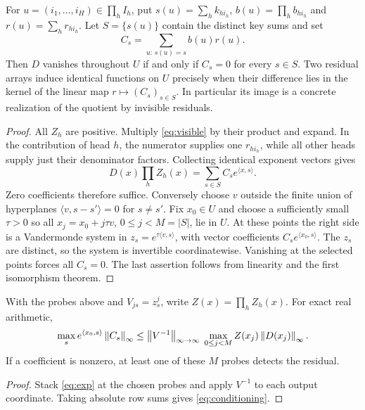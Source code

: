 \begin{theorem}\label{thm:quotient}
For $u=(i_1,\ldots,i_H)\in\prod_h I_h$, put $s(u)=\sum_h k_{h i_h}$, $b(u)=\prod_h b_{h i_h}$ and $r(u)=\sum_h r_{h i_h}$. Let $S=\{s(u)\}$ contain the distinct key sums and set
\begin{equation}
 C_s=\sum_{u:\,s(u)=s} b(u)r(u).
 \label{eq:classes}
\end{equation}
Then $D$ vanishes throughout $U$ if and only if $C_s=0$ for every $s\in S$. Two residual arrays induce identical functions on $U$ precisely when their difference lies in the kernel of the linear map $r\mapsto(C_s)_{s\in S}$. In particular its image is a concrete realization of the quotient by invisible residuals.
\end{theorem}
\begin{proof}
All $Z_h$ are positive. Multiply \eqref{eq:visible} by their product and expand. In the contribution of head $h$, the numerator supplies one $r_{h i_h}$, while all other heads supply just their denominator factors. Collecting identical exponent vectors gives
\begin{equation}
 D(x)\prod_h Z_h(x)=\sum_{s\in S} C_s e^{\langle x,s\rangle}.
 \label{eq:exp}
\end{equation}
Zero coefficients therefore suffice. Conversely choose $v$ outside the finite union of hyperplanes $\langle v,s-s'\rangle=0$ for $s\ne s'$. Fix $x_0\in U$ and choose a sufficiently small $\tau>0$ so all $x_j=x_0+j\tau v$, $0\le j<M=|S|$, lie in $U$. At these points the right side is a Vandermonde system in $z_s=e^{\tau\langle v,s\rangle}$, with vector coefficients $C_s e^{\langle x_0,s\rangle}$. The $z_s$ are distinct, so the system is invertible coordinatewise. Vanishing at the selected points forces all $C_s=0$. The last assertion follows from linearity and the first isomorphism theorem.
\end{proof}

\begin{corollary}\label{cor:probe}
With the probes above and $V_{js}=z_s^j$, write $Z(x)=\prod_h Z_h(x)$. For exact real arithmetic,
\begin{equation}
 \max_s e^{\langle x_0,s\rangle}\left\lVert C_s\right\rVert_\infty
 \le \left\lVert V^{-1}\right\rVert_{\infty\to\infty}\;\max_{0\le j<M}Z(x_j)\left\lVert D(x_j)\right\rVert_\infty .
 \label{eq:conditioning}
\end{equation}
If a coefficient is nonzero, at least one of these $M$ probes detects the residual.
\end{corollary}
\begin{proof}
Stack \eqref{eq:exp} at the chosen probes and apply $V^{-1}$ to each output coordinate. Taking absolute row sums gives \eqref{eq:conditioning}.
\end{proof}

